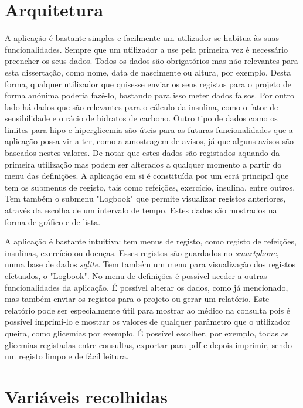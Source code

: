 \section{Arquitetura}

A aplicação é bastante simples e facilmente um utilizador se habitua às suas funcionalidades. Sempre que um utilizador a use pela primeira vez é necessário preencher os seus dados. Todos os dados são obrigatórios mas não relevantes para esta dissertação, como nome, data de nascimente ou altura, por exemplo. Desta forma, qualquer utilizador que quisesse enviar os seus registos para o projeto de forma anónima poderia fazê-lo, bastando para isso meter dados falsos. 
Por outro lado há dados que são relevantes para o cálculo da insulina, como o fator de sensibilidade e o rácio de hidratos de carbono. Outro tipo de dados como os limites para hipo e hiperglicemia são úteis para as futuras funcionalidades que a aplicação possa vir a ter, como a amostragem de avisos, já que alguns avisos são baseados nestes valores. De notar que estes dados são registados aquando da primeira utilização mas podem ser alterados a qualquer momento a partir do menu das definições.
A aplicação em si é constituída por um ecrã principal que tem os submenus de registo, tais como refeições, exercício, insulina, entre outros. Tem também o submenu "Logbook" que permite visualizar registos anteriores, através da escolha de um intervalo de tempo. Estes dados são mostrados na forma de gráfico e de lista.

A aplicação é bastante intuitiva: tem menus de registo, como registo de refeições, insulinas, exercício ou doenças. Esses registos são guardados no \textit{smartphone}, numa base de dados \textit{sqlite}. Tem também um menu para visualização dos registos efetuados, o "Logbook". 
No menu de definições é possível aceder a outras funcionalidades da aplicação. É possível alterar os dados, como já mencionado, mas também enviar os registos para o projeto ou gerar um relatório. Este relatório pode ser especialmente útil para mostrar ao médico na consulta pois é possível imprimi-lo e mostrar os valores de qualquer parâmetro que o utilizador queira, como glicemias por exemplo. É possível escolher, por exemplo, todas as glicemias registadas entre consultas, exportar para pdf e depois imprimir, sendo um registo limpo e de fácil leitura.

\section{Variáveis recolhidas}


